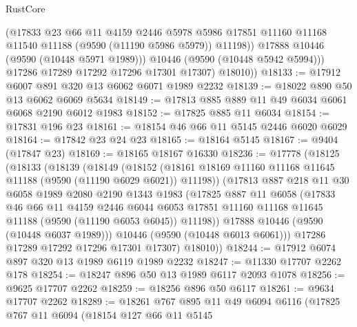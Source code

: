 \begin{lexlean}{RustCore}
\begin{coremodule}
                (@17833
                  @23
                  @66
                  @11
                  @4159
                  @2446
                  @5978
                  @5986
                  @17851
                  @11160
                  @11168
                  @11540
                  @11188
                  (@9590 (@11190 @5986 @5979))
                  @11198))
              @17888
              @10446
              (@9590 (@10448 @5971 @1989)))
            @10446
            (@9590 (@10448 @5942 @5994)))
          @17286
          @17289
          @17292
          @17296
          @17301
          @17307)
        @18010))
@18133 := @17912 @6007 @891 @320 @13 @6062 @6071 @1989 @2232
@18139 := @18022 @890 @50 @13 @6062 @6069 @5634
@18149 := @17813 @885 @889 @11 @49 @6034 @6061 @6068 @2190 @6012 @1983
@18152 := @17825 @885 @11 @6034
@18154 := @17831 @196 @23
@18161 := @18154 @46 @66 @11 @5145 @2446 @6020 @6029
@18164 := @17842 @23 @24 @23
@18165 := @18164 @5145
@18167 := @9404 (@17847 @23)
@18169 := @18165 @18167 @16330
@18236 := @17778
    (@18125
      (@18133
        (@18139
          (@18149
            (@18152 (@18161 @18169 @11160 @11168 @11645 @11188 (@9590 (@11190 @6029 @6021)) @11198))
            (@17813
              @887
              @218
              @11
              @30
              @6058
              @1989
              @2080
              @2190
              @1343
              @1983
              (@17825
                @887
                @11
                @6058
                (@17833
                  @46
                  @66
                  @11
                  @4159
                  @2446
                  @6044
                  @6053
                  @17851
                  @11160
                  @11168
                  @11645
                  @11188
                  (@9590 (@11190 @6053 @6045))
                  @11198))
              @17888
              @10446
              (@9590 (@10448 @6037 @1989)))
            @10446
            (@9590 (@10448 @6013 @6061)))
          @17286
          @17289
          @17292
          @17296
          @17301
          @17307)
        @18010))
@18244 := @17912 @6074 @897 @320 @13 @1989 @6119 @1989 @2232
@18247 := @11330 @17707 @2262 @178
@18254 := @18247 @896 @50 @13 @1989 @6117 @2093 @1078
@18256 := @9625 @17707 @2262
@18259 := @18256 @896 @50 @6117
@18261 := @9634 @17707 @2262
@18289 := @18261
    @767
    @895
    @11
    @49
    @6094
    @6116
    (@17825
      @767
      @11
      @6094
      (@18154
        @127
        @66
        @11
        @5145

\end{coremodule}
\end{lexlean}
